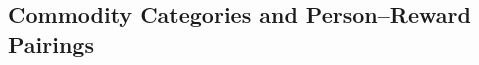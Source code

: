 \documentclass[11pt,a4paper]{article}
\theoremstyle{plain}
\theoremstyle{definition}
\begin{document}
\subsection{Commodity Categories and Person--Reward Pairings}
\label{sec:goods}

\end{document}
